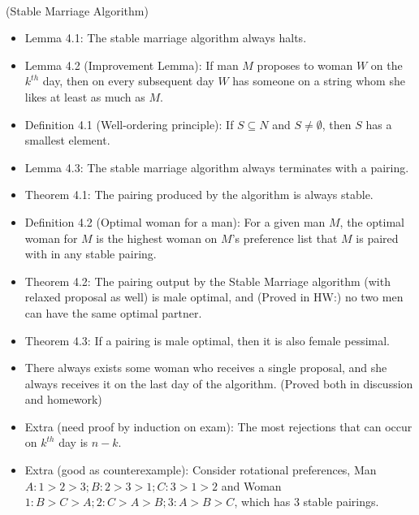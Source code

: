 \documentclass{article}
\begin{document}
\\
(Stable Marriage Algorithm)
\begin{itemize}
	\item Lemma 4.1: The stable marriage algorithm always halts.
	\item Lemma 4.2 (Improvement Lemma): If man $M$ proposes to woman $W$ on the $k^{th}$ day, then on every subsequent day $W$ has someone on a string whom she likes at least as much as $M$.
	\item Definition 4.1 (Well-ordering principle): If $S\subseteq N$ and $S\neq\emptyset$, then $S$ has a smallest element.
	\item Lemma 4.3: The stable marriage algorithm always terminates with a pairing.
	\item Theorem 4.1: The pairing produced by the algorithm is always stable.
	\item Definition 4.2 (Optimal woman for a man): For a given man $M$, the optimal woman for $M$ is the highest woman on $M$'s preference list that $M$ is paired with in any stable pairing.
	\item Theorem 4.2: The pairing output by the Stable Marriage algorithm (with relaxed proposal as well) is male optimal, and (Proved in HW:) no two men can have the same optimal partner.
	\item Theorem 4.3: If a pairing is male optimal, then it is also female pessimal.
	\item There always exists some woman who receives a single proposal, and she always receives it on the last day of the algorithm. (Proved both in discussion and homework)
	\item Extra (need proof by induction on exam): The most rejections that can occur on $k^{th}$ day is $n - k.$
	\item Extra (good as counterexample): Consider rotational preferences, Man $A: 1>2>3; B:2>3>1; C:3>1>2$ and Woman $1: B>C>A; 2: C>A>B; 3: A>B>C$, which has 3 stable pairings.
\end{itemize}
\end{document}
